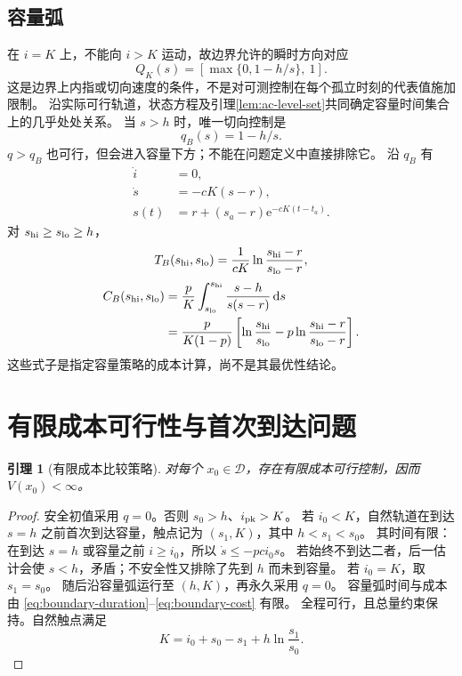 \documentclass[11pt,a4paper,UTF8]{ctexart}
\newtheorem{lemma}[theorem]{引理}
\theoremstyle{definition}
\newcommand{\Dcal}{\mathcal D}
\newcommand{\dd}{\,\mathrm d}
\newcommand{\e}{\mathrm e}
\begin{document}
\subsection{容量弧}
\label{sec:boundary-arc}
在 $i=K$ 上，不能向 $i>K$ 运动，故边界允许的瞬时方向对应
\begin{equation}
Q_K(s)=\left[\max\{0,1-h/s\},\ 1\right].
\label{eq:boundary-feasible}
\end{equation}
这是边界上内指或切向速度的条件，不是对可测控制在每个孤立时刻的代表值施加限制。
沿实际可行轨道，状态方程及引理\ref{lem:ac-level-set}共同确定容量时间集合上的几乎处处关系。
当 $s>h$ 时，唯一切向控制是
\begin{equation}
\boxed{q_B(s)=1-h/s.}
\label{eq:qB}
\end{equation}
$q>q_B$ 也可行，但会进入容量下方；不能在问题定义中直接排除它。
沿 $q_B$ 有
\begin{align}
\dot i&=0,\label{eq:boundary-i}\\
\dot s&=-cK(s-r),\label{eq:boundary-s}\\
s(t)&=r+(s_a-r)\e^{-cK(t-t_a)}.\label{eq:boundary-s-explicit}
\end{align}
对 $s_{\rm hi}\ge s_{\rm lo}\ge h$，
\begin{equation}
T_B(s_{\rm hi},s_{\rm lo})=\frac1{cK}\ln\frac{s_{\rm hi}-r}{s_{\rm lo}-r},
\label{eq:boundary-duration}
\end{equation}
\begin{align}
C_B(s_{\rm hi},s_{\rm lo})
&=\frac pK\int_{s_{\rm lo}}^{s_{\rm hi}}\frac{s-h}{s(s-r)}\dd s\notag\\
&=\frac{p}{K(1-p)}\left[\ln\frac{s_{\rm hi}}{s_{\rm lo}}
-p\ln\frac{s_{\rm hi}-r}{s_{\rm lo}-r}\right].
\label{eq:boundary-cost}
\end{align}
这些式子是指定容量策略的成本计算，尚不是其最优性结论。

\section{有限成本可行性与首次到达问题}
\label{sec:exit-time}
\begin{lemma}[有限成本比较策略]
\label{lem:finite-feasible}
对每个 $x_0\in\Dcal$，存在有限成本可行控制，因而 $V(x_0)<\infty$。
\end{lemma}
\begin{proof}
安全初值采用 $q=0$。否则 $s_0>h$、$i_{\rm pk}>K$。
若 $i_0<K$，自然轨道在到达 $s=h$ 之前首次到达容量，触点记为 $(s_1,K)$，其中 $h<s_1<s_0$。
其时间有限：在到达 $s=h$ 或容量之前 $i\ge i_0$，所以 $\dot s\le-pci_0s$。
若始终不到达二者，后一估计会使 $s<h$，矛盾；不安全性又排除了先到 $h$ 而未到容量。
若 $i_0=K$，取 $s_1=s_0$。
随后沿容量弧运行至 $(h,K)$，再永久采用 $q=0$。
容量弧时间与成本由 \eqref{eq:boundary-duration}--\eqref{eq:boundary-cost} 有限。
全程可行，且总量约束保持。自然触点满足
\begin{equation}
K=i_0+s_0-s_1+h\ln\frac{s_1}{s_0}.
\label{eq:s1}
\end{equation}
\end{proof}
\end{document}
